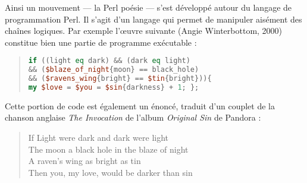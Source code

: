 \documentclass[final, a4paper, 11pt]{article}
\begin{document}
Ainsi un mouvement --- la Perl poésie --- s'est développé autour du langage de programmation Perl. Il s'agit d'un langage qui permet de manipuler aisément des chaînes logiques. Par exemple l'œuvre suivante (Angie Winterbottom, 2000) constitue bien une partie de programme exécutable :

\begin{quote}
\begin{lstlisting}[language=perl, showlines=false, frame=none, numbers=none]
if ((light eq dark) && (dark eq light)
&& ($blaze_of_night{moon} == black_hole)
&& ($ravens_wing{bright} == $tin{bright})){
my $love = $you = $sin{darkness} + 1; };
\end{lstlisting}
\end{quote}

Cette portion de code est également un énoncé, traduit d'un couplet de la chanson anglaise \emph{The Invocation} de l'album \emph{Original Sin} de Pandora :

\begin{quote}
If Light were dark and dark were light\\
The moon a black hole in the blaze of night\\
A raven's wing as bright as tin\\
Then you, my love, would be darker than sin
\end{quote}
\end{document}
